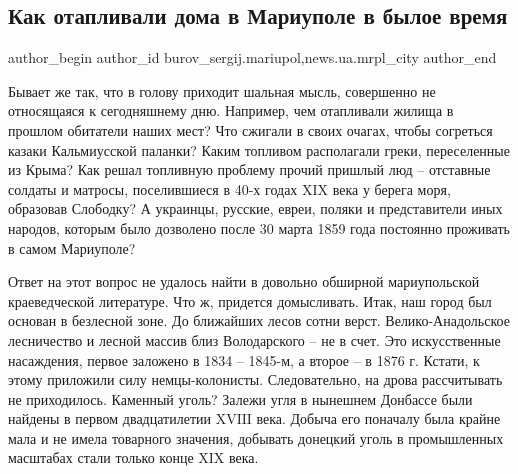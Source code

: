  
 
 
 
 
 
\subsection{Как отапливали дома в Мариуполе в былое время}
\label{sec:15_12_2018.stz.news.ua.mrpl_city.1.kak_otaplivali_doma_v_mariupole_v_byloe_vremja}
 
\ifcmt
 author_begin
   author_id burov_sergij.mariupol,news.ua.mrpl_city
 author_end
\fi


Бывает же так, что в голову приходит шальная мысль, совершенно не относящаяся к
сегодняшнему дню. Например, чем отапливали жилища в прошлом обитатели наших
мест? Что сжигали в своих очагах, чтобы согреться казаки Кальмиусской паланки?
Каким топливом располагали греки, переселенные из Крыма? Как решал топливную
проблему прочий пришлый люд – отставные солдаты и матросы, поселившиеся в 40-х
годах XΙX века у берега моря, образовав Слободку? А украинцы, русские, евреи,
поляки и представители иных народов, которым было дозволено после 30 марта 1859
года постоянно проживать в самом Мариуполе?


Ответ на этот вопрос не удалось найти в довольно обширной мариупольской
краеведческой литературе. Что ж, придется домысливать. Итак, наш город был
основан в безлесной зоне. До ближайших лесов сотни верст. Велико-Анадольское
лесничество и лесной массив близ Володарского – не в счет. Это искусственные
насаждения, первое заложено в 1834 – 1845-м, а второе – в 1876 г. Кстати, к
этому приложили силу немцы-колонисты. Следовательно, на дрова рассчитывать не
приходилось. Каменный уголь? Залежи угля в нынешнем Донбассе были найдены в
первом двадцатилетии XVΙΙΙ века. Добыча его поначалу была крайне мала и не
имела товарного значения, добывать донецкий уголь в промышленных масштабах
стали только конце XIX века.

